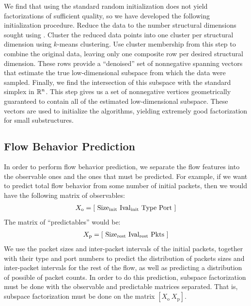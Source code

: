 \documentclass[conference]{IEEEtran}
\begin{document}

We find that using the standard random  initialization does not yield factorizations of sufficient quality, so we have developed the following initialization procedure.
Reduce the data to the number structural dimensions sought using .
Cluster the reduced data points into one cluster per structural dimension using $k$-means clustering.
Use cluster membership from this step to combine the original data, leaving only one composite row per desired structural dimension.
These rows provide a ``denoised'' set of nonnegative spanning vectors that estimate the true low-dimensional subspace from which the data were sampled.
Finally, we find the intersection of this subspace with the standard simplex in $\mathbb{R}^n$.\cddnote
This step gives us a set of nonnegative vertices geometrically guaranteed to contain all of the estimated low-dimensional subspace.
These vectors are used to initialize the  algorithms, yielding extremely good factorization for small substructures.

\subsection{Flow Behavior Prediction}

In order to perform flow behavior prediction, we separate the flow features into the observable ones and the ones that must be predicted.
For example, if we want to predict total flow behavior from some number of initial packets, then we would have the following matrix of observables:
\begin{align}
  X_\text{o} = {\left[ ~
    \text{Size}_{\text{init}} ~
    \text{Ival}_{\text{init}} ~
    \text{Type} ~
    \text{Port} ~
  \right]}
\end{align}
The matrix of ``predictables'' would be:
\begin{align}
  X_\text{p} = {\left[ ~
    \text{Size}_{\text{rest}} ~
    \text{Ival}_{\text{rest}} ~
    \text{Pkts} ~
  \right]}
\end{align}
We use the packet sizes and inter-packet intervals of the initial packets, together with their  type and port numbers to predict the distribution of packets sizes and inter-packet intervals for the rest of the flow, as well as predicting a distribution of possible of packet counts.
In order to do this prediction, subspace factorization must be done with the observable and predictable matrices separated.
That is, subspace factorization must be done on the matrix $[X_\text{o}~X_\text{p}]$.
\end{document}
